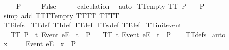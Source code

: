 \begin{isabellebody}
\ \isamarkupfalse%
\ {\isachardoublequoteopen}{\isacharbrackleft}{\isacharbrackright}\ {\isasymnotin}\ P{\isachardoublequoteclose}\isanewline
\ \ \isamarkupfalse%
\ \isamarkupfalse%
\ {\isachardoublequoteopen}False{\isachardoublequoteclose}\isanewline
\ \ \ \ \isamarkupfalse%
\ calculation\ \isamarkupfalse%
\ auto\isanewline
{}\isamarkupfalse%
%
\endisatagproof
{\isafoldproof}%
%
\isadelimproof
\isanewline
%
\endisadelimproof
\isanewline
{}\isamarkupfalse%
\ TT{\isacharunderscore}empty{\isacharcolon}\ {\isachardoublequoteopen}TT\ P\ {\isasymLongrightarrow}\ {\isacharbrackleft}{\isacharbrackright}\ {\isasymin}\ P{\isachardoublequoteclose}\isanewline
%
\isadelimproof
\ \ %
\endisadelimproof
%
\isatagproof
{}\isamarkupfalse%
\ {\isacharparenleft}simp\ add{\isacharcolon}\ TT{}{\isacharunderscore}TT{}{\isacharunderscore}empty\ TT{\isacharunderscore}TT{}\ TT{\isacharunderscore}TT{}{\isacharparenright}%
\endisatagproof
{\isafoldproof}%
%
\isadelimproof
\isanewline
%
\endisadelimproof
\isanewline
{}\isamarkupfalse%
\ TT{\isacharunderscore}defs\ {\isacharequal}\ TT{\isacharunderscore}def\ TT{}{\isacharunderscore}def\ TT{}{\isacharunderscore}def\ TT{}w{\isacharunderscore}def\ TT{}{\isacharunderscore}def\isanewline
\isanewline
{}\isamarkupfalse%
\ TT{\isacharunderscore}init{\isacharunderscore}event{\isacharcolon}\isanewline
\ \ \ {\isachardoublequoteopen}TT\ P{\isachardoublequoteclose}\ {\isachardoublequoteopen}{\isasymexists}\ t{\isachardot}\ {\isacharbrackleft}Event\ e{\isacharbrackright}\isactrlsub E\ {\isacharhash}\ t\ {\isasymin}\ P{\isachardoublequoteclose}\isanewline
\ \ \ {\isachardoublequoteopen}TT\ {\isacharbraceleft}t{\isachardot}\ {\isacharbrackleft}Event\ e{\isacharbrackright}\isactrlsub E\ {\isacharhash}\ t\ {\isasymin}\ P{\isacharbraceright}{\isachardoublequoteclose}\isanewline
%
\isadelimproof
\ \ %
\endisadelimproof
%
\isatagproof
{}\isamarkupfalse%
\ TT{\isacharunderscore}defs\isanewline
{}\isamarkupfalse%
\ auto\isanewline
\ \ \isamarkupfalse%
\ x\ \isanewline
\ \ \isamarkupfalse%
\ {\isachardoublequoteopen}{\isacharbrackleft}Event\ e{\isacharbrackright}\isactrlsub E\ {\isacharhash}\ x\ {\isasymin}\ P{\isachardoublequoteclose}\isanewline
\ \ \isamarkupfalse%
\ \isamarkupfalse%

\end{isabellebody}
